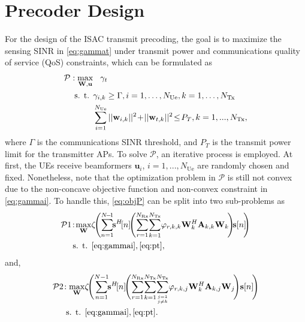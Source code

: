 \documentclass[conference,twocolumn,a4paper]{IEEEtran}
\theoremstyle{remark} \newtheorem{remark}{Remark}
\begin{document}
\section{Precoder Design}
For the design of the ISAC transmit precoding, the goal is to maximize the sensing SINR in \eqref{eq:gammat} under transmit power and communications quality of service (QoS) constraints, which can be formulated as
\begin{subequations}
\begin{align}
\mathcal{P}: \max_{\mathbf{W},\mathbf{u}} &  \hspace{3mm}\gamma_t \label{eq:objP}\\
\text { s. t. } & \gamma_{i,k} \geq \Gamma, i=1, \ldots, N_{\mathrm{Ue}}, k=1, \ldots, N_{\mathrm{Tx}}\label{eq:gammai}\\
& \sum_{i=1}^{N_{\mathrm{Ue}}}||\mathbf{w}_{i,k}||^2\!+\!||\mathbf{w}_{t,k}||^2\!\leq \!P_T, k=1,...,N_{\mathrm{Tx}},\label{eq:pt}
\end{align}
\end{subequations}
where $\Gamma$ is the communications SINR threshold, and $P_T$ is the transmit power limit for the transmitter APs. To solve $\mathcal{P}$, an iterative process is employed. At first, the UEs receive beamformers $\mathbf{u}_i$, $i$$=$$1,...,N_{\mathrm{Ue}}$ are randomly chosen and fixed. Nonetheless, note that the optimization problem in $\mathcal{P}$ is still not convex due to the non-concave objective function and non-convex constraint in \eqref{eq:gammai}. To handle this, \eqref{eq:objP} can be split into two sub-problems as
\begin{subequations}
\begin{align}
\mathcal{P}1\!:\! \max_{\mathbf{W}} &\zeta\!\Bigg(\!\sum_{n=1}^{N\!-\!1}\!\!\mathbf{s}^H\![n]\!\Bigg(\!\sum_{r=1}^{N_{\mathrm{Rx}}}\! \sum_{k=1}^{N_{\mathrm{Tx}}}\! \varphi_{r,k,k}\mathbf{W}_k^H\mathbf{A}_{k,k}\mathbf{W}_k\!\Bigg)\!\mathbf{s}[n]\!\!\Bigg)\label{eq:p1}\\
\text { s. t. } & \eqref{eq:gammai}, \eqref{eq:pt},\nonumber 
\end{align}
\end{subequations}
and, 
\begin{subequations}
\begin{align}
\mathcal{P}2\!: \max_{\mathbf{W}} &\zeta\!\Bigg(\!\sum_{n=1}^{N-1}\!\!\mathbf{s}^H\![n]\!\Bigg(\!\sum_{r=1}^{N_{\mathrm{Rx}}}\! \sum_{k=1}^{N_{\mathrm{Tx}}}\! \sum_{j=1 \atop j \neq k}^{N_{\mathrm{Tx}}}\! \varphi_{r,k,j}\mathbf{W}_k^H\mathbf{A}_{k,j}\mathbf{W}_j\!\Bigg) \mathbf{s}[n]\!\Bigg)\label{eq:p2}\\
\text { s. t. } & \eqref{eq:gammai},\eqref{eq:pt}.\nonumber 
\end{align}
\end{subequations}
\end{document}
